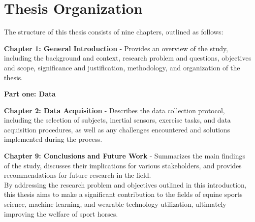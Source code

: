 \section{Thesis Organization}
\label{sec:intro_thesis_organization}

The structure of this thesis consists of nine chapters, outlined as follows:

\vspace{0.25cm}

\textbf{Chapter 1: General Introduction} - Provides an overview of the study, including the background and context, research problem and questions, objectives and scope, significance and justification, methodology, and organization of the thesis.\\

\vspace{0.5cm}

\noindent \textbf{\large Part one: Data} 

\vspace{0.25cm}

\textbf{Chapter 2: Data Acquisition} - Describes the data collection protocol, including the selection of subjects, inertial sensors, exercise tasks, and data acquisition procedures, as well as any challenges encountered and solutions implemented during the process.\\

\vspace{0.5cm}


\textbf{Chapter 9: Conclusions and Future Work} - Summarizes the main findings of the study, discusses their implications for various stakeholders, and provides recommendations for future research in the field.\\

By addressing the research problem and objectives outlined in this introduction, this thesis aims to make a significant contribution to the fields of equine sports science, machine learning, and wearable technology utilization, ultimately improving the welfare of sport horses.


